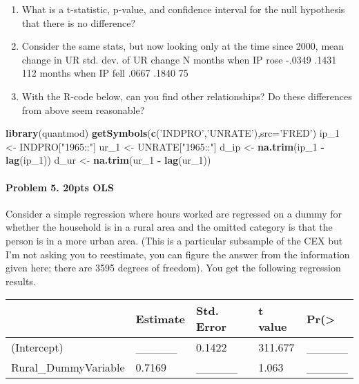 \documentclass[]{article}
\newenvironment{Shaded}{\begin{snugshade}}{\end{snugshade}}
\newcommand{\KeywordTok}[1]{\textcolor[rgb]{0.13,0.29,0.53}{\textbf{#1}}}
\newcommand{\DataTypeTok}[1]{\textcolor[rgb]{0.13,0.29,0.53}{#1}}
\newcommand{\DecValTok}[1]{\textcolor[rgb]{0.00,0.00,0.81}{#1}}
\newcommand{\StringTok}[1]{\textcolor[rgb]{0.31,0.60,0.02}{#1}}
\newcommand{\OperatorTok}[1]{\textcolor[rgb]{0.81,0.36,0.00}{\textbf{#1}}}
\newcommand{\NormalTok}[1]{#1}
\providecommand{\tightlist}{%
  \setlength{\itemsep}{0pt}\setlength{\parskip}{0pt}}
\let\oldparagraph\paragraph
\renewcommand{\paragraph}[1]{\oldparagraph{#1}\mbox{}}
\begin{document}
\begin{enumerate}
\def\labelenumi{\alph{enumi}.}
\tightlist
\item
  What is a t-statistic, p-value, and confidence interval for the null
  hypothesis that there is no difference?
\item
  Consider the same stats, but now looking only at the time since 2000,
  mean change in UR std. dev. of UR change N months when IP rose -.0349
  .1431 112 months when IP fell .0667 .1840 75
\item
  With the R-code below, can you find other relationships? Do these
  differences from above seem reasonable?
\end{enumerate}

\begin{Shaded}
\begin{Highlighting}[]
\KeywordTok{library}\NormalTok{(quantmod)}
\KeywordTok{getSymbols}\NormalTok{(}\KeywordTok{c}\NormalTok{(}\StringTok{'INDPRO'}\NormalTok{,}\StringTok{'UNRATE'}\NormalTok{),}\DataTypeTok{src=}\StringTok{'FRED'}\NormalTok{)}
\NormalTok{ip_}\DecValTok{1}\NormalTok{ <-}\StringTok{ }\NormalTok{INDPRO[}\StringTok{"1965::"}\NormalTok{]}
\NormalTok{ur_}\DecValTok{1}\NormalTok{ <-}\StringTok{ }\NormalTok{UNRATE[}\StringTok{"1965::"}\NormalTok{]}
\NormalTok{d_ip <-}\StringTok{ }\KeywordTok{na.trim}\NormalTok{(ip_}\DecValTok{1} \OperatorTok{-}\StringTok{ }\KeywordTok{lag}\NormalTok{(ip_}\DecValTok{1}\NormalTok{))}
\NormalTok{d_ur <-}\StringTok{ }\KeywordTok{na.trim}\NormalTok{(ur_}\DecValTok{1} \OperatorTok{-}\StringTok{ }\KeywordTok{lag}\NormalTok{(ur_}\DecValTok{1}\NormalTok{))}
\end{Highlighting}
\end{Shaded}

\paragraph{Problem 5. 20pts OLS}\label{problem-5.-20pts-ols}

Consider a simple regression where hours worked are regressed on a dummy
for whether the household is in a rural area and the omitted category is
that the person is in a more urban area. (This is a particular subsample
of the CEX but I'm not asking you to reestimate, you can figure the
answer from the information given here; there are 3595 degrees of
freedom). You get the following regression results.

\begin{longtable}[]{@{}lllll@{}}
\toprule
& Estimate & Std. Error & t value & Pr(\textgreater{}\tabularnewline
\midrule
\endhead
(Intercept) & \_\_\_\_\_ & 0.1422 & 311.677 & \_\_\_\_\_\tabularnewline
Rural\_DummyVariable & 0.7169 & \_\_\_\_\_ & 1.063 &
\_\_\_\_\_\tabularnewline
\bottomrule
\end{longtable}
\end{document}
